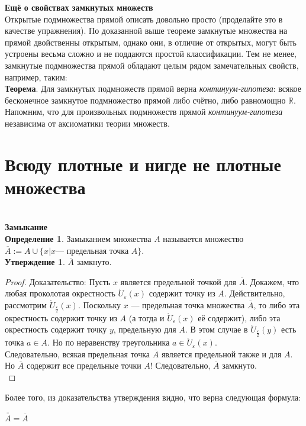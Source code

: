 \documentclass{report}
\begin{document}
\textbf{Ещё о свойствах замкнутых множеств}\\ 
Открытые подмножества прямой описать довольно просто (проделайте это в качестве упражнения). По доказанной выше теореме замкнутые множества на прямой двойственны открытым, однако они, в отличие от открытых, могут быть устроены весьма сложно и не поддаются простой классификации. Тем не менее, замкнутые подмножества прямой обладают целым рядом замечательных свойств, например, таким: \\

\textbf{Теорема}. Для замкнутых подмножеств прямой верна \textit{континуум-гипотеза}: всякое бесконечное замкнутое подмножество прямой либо счётно, либо равномощно $\mathbb{R}$. \\

Напомним, что для произвольных подмножеств прямой \textit{континуум-гипотеза} независима от аксиоматики теории множеств.

\section{Всюду плотные и нигде не плотные множества}\\

\textbf{Замыкание} \\
\textbf{Определение 1}. Замыканием множества $A$ называется множество $\overline{A} := A \cup \{ x | x — \text{ предельная точка } A\}$. \\

\textbf{Утверждение 1}. $\overline{A}$ замкнуто. \\

\begin{proof}
Доказательство: Пусть $x$ является предельной точкой для $\overline{A}$. Докажем, что любая проколотая окрестность $\mathring{U}_{\varepsilon}(x)$ содержит точку из $A$. Действительно, рассмотрим $\mathring{U}_{\frac{\varepsilon}{2}}(x)$. Поскольку $x$ — предельная точка множества $\overline{A}$, то либо эта окрестность содержит точку из $A$ (а тогда и $\mathring{U}_{\varepsilon}(x)$ её содержит), либо эта окрестность содержит точку $y$, предельную для $A$. В этом случае в $\mathring{U}_{\frac{\varepsilon}{2}}(y)$ есть точка $a \in A$. Но по неравенству треугольника $a \in \mathring{U}_{\varepsilon}(x)$. \\

Следовательно, всякая предельная точка $\overline{A}$ является предельной также и для $A$. Но $\overline{A}$ содержит все предельные точки $A!$ Следовательно, $\overline{A}$ замкнуто.\\
\end{proof}
Более того, из доказательства утверждения видно, что верна следующая формула:
\begin{center}
$\overline{\overline{A}} = \overline{A}$
\end{center}
\end{document}
